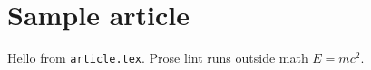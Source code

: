 \section{Sample article}
\label{sec:sample}
Hello from \texttt{article.tex}. Prose lint runs outside math $E=mc^2$.
